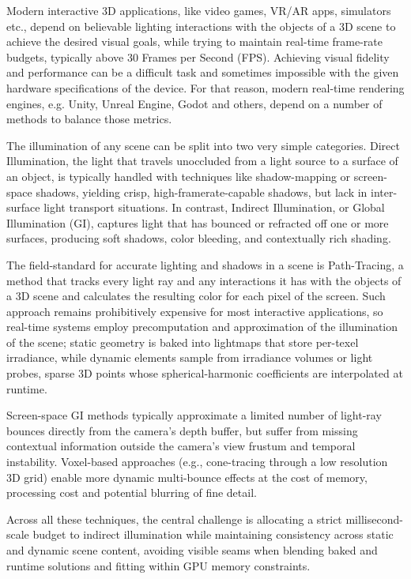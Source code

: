 Modern interactive 3D applications, like video games, VR/AR apps, simulators etc., depend on believable lighting interactions with the objects of a 3D scene to achieve the desired visual goals, while trying to maintain real-time frame-rate budgets, typically above 30 Frames per Second (FPS). Achieving visual fidelity and performance can be a difficult task and sometimes impossible with the given hardware specifications of the device. For that reason, modern real-time rendering engines, e.g. Unity, Unreal Engine, Godot and others, depend on a number of methods to balance those metrics. 

The illumination of any scene can be split into two very simple categories. Direct Illumination, the light that travels unoccluded from a light source to a surface of an object, is typically handled with techniques like shadow-mapping or screen-space shadows, yielding crisp, high-framerate-capable shadows, but lack in inter-surface light transport situations. In contrast, Indirect Illumination, or Global Illumination (GI), captures light that has bounced or refracted off one or more surfaces, producing soft shadows, color bleeding, and contextually rich shading. 

The field-standard for accurate lighting and shadows in a scene is Path-Tracing, a method that tracks every light ray and any interactions it has with the objects of a 3D scene and calculates the resulting color for each pixel of the screen. Such approach remains prohibitively expensive for most interactive applications, so real-time systems employ precomputation and approximation of the illumination of the scene; static geometry is baked into lightmaps that store per-texel irradiance, while dynamic elements sample from irradiance volumes or light probes, sparse 3D points whose spherical-harmonic coefficients are interpolated at runtime. 

Screen-space GI methods typically approximate a limited number of light-ray bounces directly from the camera's depth buffer, but suffer from missing contextual information outside the camera's view frustum and temporal instability. Voxel-based approaches (e.g., cone-tracing through a low resolution 3D grid) %
enable more dynamic multi-bounce effects at the cost of memory, processing cost and potential blurring of fine detail. 

Across all these techniques, the central challenge is allocating a strict millisecond-scale budget to indirect illumination while maintaining consistency across static and dynamic scene content, avoiding visible seams when blending baked and runtime solutions and fitting within GPU memory constraints. 

